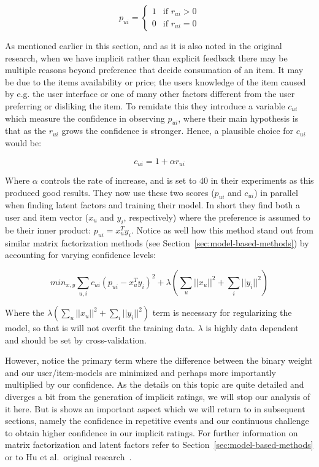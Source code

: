 \begin{equation}
  p_{ui} =
  \begin{cases}
    1 & \text{if $r_{ui} > 0$} \\
    0 & \text{if $r_{ui} = 0$}
  \end{cases}
\end{equation}

As mentioned earlier in this section, and as it is also noted in the original
research, when we have implicit rather than explicit feedback there may be
multiple reasons beyond preference that decide consumation of an item. It may
be due to the items availability or price; the users knowledge of the item
caused by e.g. the user interface or one of many other factors different from
the user preferring or disliking the item. To remidate this they introduce a
variable $c_{ui}$ which measure the confidence in observing $p_{ui}$, where
their main hypothesis is that as the $r_{ui}$ grows the confidence is stronger.
Hence, a plausible choice for $c_{ui}$ would be:

\begin{equation}
c_{ui} = 1 + \alpha r_{ui}
\end{equation}

Where $\alpha$ controls the rate of increase, and is set to $40$ in their
experiments as this produced good results. They now use these two scores
($p_{ui}$ and $c_{ui}$) in parallel when finding latent factors and training
their model. In short they find both a user and item vector ($x_u$ and $y_i$,
respectively) where the preference is assumed to be their inner product: $p_{ui}
= x_{u}^{T} y_{i}$. Notice as well how this method stand out from similar
matrix factorization methods (see Section~\ref{sec:model-based-methods}) by
accounting for varying confidence levels:

\begin{equation}
  min_{x,y} \sum _{u,i} c_{ui} (p_{ui} - x_{u}^{T} y_i)^2 + \lambda (\sum _{u}
  || x_u ||^2 + \sum_{i} || y_i ||^2)
\end{equation}

Where the $\lambda (\sum _{u} || x_u ||^2 + \sum_{i} || y_i ||^2)$ term is
necessary for regularizing the model, so that is will not overfit the
training data. $\lambda$ is highly data dependent and should be set by
cross-validation.

However, notice the primary term where the difference between the binary weight
and our user/item-models are minimized and perhaps more importantly multiplied
by our confidence. As the details on this topic are quite detailed and diverges
a bit from the generation of implicit ratings, we will stop our analysis of it
here. But is shows an important aspect which we will return to in subsequent
sections, namely the confidence in repetitive events and our continuous
challenge to obtain higher confidence in our implicit ratings. For further
information on matrix factorization and latent factors refer to
Section~\ref{sec:model-based-methods} or to Hu et al.\ original
research~\cite{Hu2008}.

